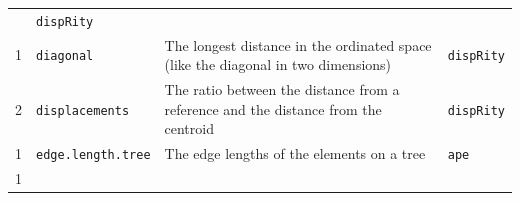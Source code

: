 \documentclass[]{book}
\begin{document}
\begin{longtable}[]{@{}llll@{}}
\begin{minipage}[t]{0.64\columnwidth}
\end{minipage} & \begin{minipage}[t]{0.10\columnwidth}\raggedright
\texttt{dispRity}\strut
\end{minipage}\tabularnewline
\begin{minipage}[t]{0.07\columnwidth}\raggedright
1\strut
\end{minipage} & \begin{minipage}[t]{0.07\columnwidth}\raggedright
\texttt{diagonal}\strut
\end{minipage} & \begin{minipage}[t]{0.64\columnwidth}\raggedright
The longest distance in the ordinated space (like the diagonal in two dimensions)\strut
\end{minipage} & \begin{minipage}[t]{0.10\columnwidth}\raggedright
\texttt{dispRity}\strut
\end{minipage}\tabularnewline
\begin{minipage}[t]{0.07\columnwidth}\raggedright
2\strut
\end{minipage} & \begin{minipage}[t]{0.07\columnwidth}\raggedright
\texttt{displacements}\strut
\end{minipage} & \begin{minipage}[t]{0.64\columnwidth}\raggedright
The ratio between the distance from a reference and the distance from the centroid\strut
\end{minipage} & \begin{minipage}[t]{0.10\columnwidth}\raggedright
\texttt{dispRity}\strut
\end{minipage}\tabularnewline
\begin{minipage}[t]{0.07\columnwidth}\raggedright
1\strut
\end{minipage} & \begin{minipage}[t]{0.07\columnwidth}\raggedright
\texttt{edge.length.tree}\strut
\end{minipage} & \begin{minipage}[t]{0.64\columnwidth}\raggedright
The edge lengths of the elements on a tree\strut
\end{minipage} & \begin{minipage}[t]{0.10\columnwidth}\raggedright
\texttt{ape}\strut
\end{minipage}\tabularnewline
\begin{minipage}[t]{0.07\columnwidth}\raggedright
1\strut
\end{minipage} & \begin{minipage}[t]{0.07\columnwidth}\raggedright

\end{minipage}
\end{longtable}
\end{document}
